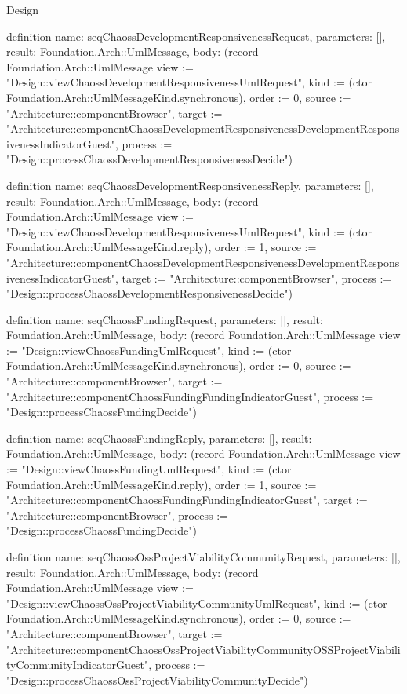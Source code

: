 \begin{lexlean}{Design}
\begin{semanticmodule}
definition{
  name: seqChaossDevelopmentResponsivenessRequest,
  parameters: [],
  result: Foundation.Arch::UmlMessage,
  body: (record Foundation.Arch::UmlMessage {view := "Design::viewChaossDevelopmentResponsivenessUmlRequest", kind := (ctor Foundation.Arch::UmlMessageKind.synchronous), order := 0, source := "Architecture::componentBrowser", target := "Architecture::componentChaossDevelopmentResponsivenessDevelopmentResponsivenessIndicatorGuest", process := "Design::processChaossDevelopmentResponsivenessDecide"})
}

definition{
  name: seqChaossDevelopmentResponsivenessReply,
  parameters: [],
  result: Foundation.Arch::UmlMessage,
  body: (record Foundation.Arch::UmlMessage {view := "Design::viewChaossDevelopmentResponsivenessUmlRequest", kind := (ctor Foundation.Arch::UmlMessageKind.reply), order := 1, source := "Architecture::componentChaossDevelopmentResponsivenessDevelopmentResponsivenessIndicatorGuest", target := "Architecture::componentBrowser", process := "Design::processChaossDevelopmentResponsivenessDecide"})
}

definition{
  name: seqChaossFundingRequest,
  parameters: [],
  result: Foundation.Arch::UmlMessage,
  body: (record Foundation.Arch::UmlMessage {view := "Design::viewChaossFundingUmlRequest", kind := (ctor Foundation.Arch::UmlMessageKind.synchronous), order := 0, source := "Architecture::componentBrowser", target := "Architecture::componentChaossFundingFundingIndicatorGuest", process := "Design::processChaossFundingDecide"})
}

definition{
  name: seqChaossFundingReply,
  parameters: [],
  result: Foundation.Arch::UmlMessage,
  body: (record Foundation.Arch::UmlMessage {view := "Design::viewChaossFundingUmlRequest", kind := (ctor Foundation.Arch::UmlMessageKind.reply), order := 1, source := "Architecture::componentChaossFundingFundingIndicatorGuest", target := "Architecture::componentBrowser", process := "Design::processChaossFundingDecide"})
}

definition{
  name: seqChaossOssProjectViabilityCommunityRequest,
  parameters: [],
  result: Foundation.Arch::UmlMessage,
  body: (record Foundation.Arch::UmlMessage {view := "Design::viewChaossOssProjectViabilityCommunityUmlRequest", kind := (ctor Foundation.Arch::UmlMessageKind.synchronous), order := 0, source := "Architecture::componentBrowser", target := "Architecture::componentChaossOssProjectViabilityCommunityOSSProjectViabilityCommunityIndicatorGuest", process := "Design::processChaossOssProjectViabilityCommunityDecide"})
}


\end{semanticmodule}
\end{lexlean}
